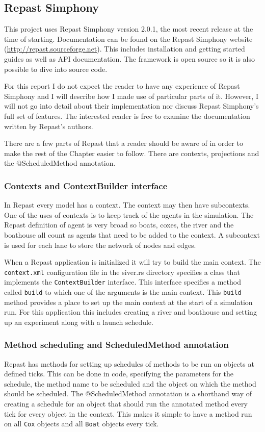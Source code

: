   \subsection{Repast Simphony}
  This project uses Repast Simphony version 2.0.1, the most recent
  release at the time of starting. Documentation can be found on the
  Repast Simphony website (\url{http://repast.sourceforge.net}). This includes installation and getting
  started guides as well as API documentation. The framework is
  open source so it is also possible to dive into source code. 
  
  For this
  report I do not
  expect the reader to have any experience of Repast Simphony and I
  will describe how I made use of
  particular parts of it. However, I will not go into detail about
  their implementation nor discuss Repast Simphony's full set of
  features. The interested reader is free to
  examine the documentation written by Repast's authors.
  
  There are a few parts of Repast that a reader should be aware of in
  order to make the rest of the Chapter easier to follow. There are contexts, projections and the
  @ScheduledMethod annotation. 

  \subsubsection{Contexts and ContextBuilder interface}
  In Repast every model has a context. The context may then have
  subcontexts. One of the uses of contexts is to keep track of the
  agents in the simulation. The Repast definition of agent is very
  broad so boats, coxes, the river and the boathouse all count as
  agents that need to be added to the context. A subcontext is used
  for each lane to store the network of nodes and edges.

  When a Repast application is initialized it will try to build the
  main context. The \texttt{context.xml} configuration file in the siver.rs directory
  specifies a class that implements the \texttt{ContextBuilder} interface. This
  interface specifies a method called \texttt{build} to which one of the
  arguments is the main context. This \texttt{build} method provides a
  place to set up the main context at the start of a simulation run. For this application this
  includes creating a river and boathouse  and setting up an
  experiment along with a launch schedule.

  \subsubsection{Method scheduling and ScheduledMethod annotation}
  Repast has methods for setting up schedules of methods to be run on
  objects at defined ticks. This can be done in code, specifying the
  parameters for the schedule, the method name to be scheduled and the
  object on which the method should be scheduled. The @ScheduledMethod annotation is a
  shorthand way of creating a schedule for an object that should run
  the annotated method every tick for every object in the
  context. This makes it simple to have a method run on all \texttt{Cox}
  objects and all \texttt{Boat} objects every tick.


